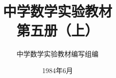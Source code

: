 \documentclass[b5paper, openany]{ctexbook}
\theoremstyle{plain}
\begin{document}
\title{\Huge\bfseries  中学数学实验教材\\第五册（上）}



\author{\Large 中学数学实验教材编写组编}
\date{\Large 1984年6月}

\maketitle




\frontmatter


\tableofcontents


\mainmatter

  

   
  
  
% 

%  
%  
%  
\end{document}
